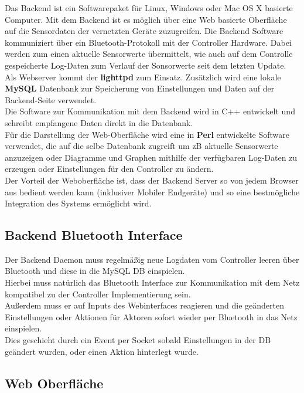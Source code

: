 \documentclass[12pt,a4paper]{article}
\begin{document}
Das Backend ist ein Softwarepaket für Linux, Windows oder Mac OS X basierte Computer. Mit dem Backend ist es möglich über eine Web basierte Oberfläche auf die Sensordaten der vernetzten Geräte zuzugreifen. Die Backend Software kommuniziert über ein Bluetooth-Protokoll mit der Controller Hardware. Dabei werden zum einen aktuelle Sensorwerte übermittelt, wie auch auf dem Controlle gespeicherte Log-Daten zum Verlauf der Sonsorwerte seit dem letzten Update.\\
Als Webserver kommt der {\bf lighttpd} zum Einsatz. Zusätzlich wird eine lokale {\bf MySQL} Datenbank zur Speicherung von Einstellungen und Daten auf der Backend-Seite verwendet.\\
Die Software zur Kommunikation mit dem Backend wird in C++ entwickelt und schreibt empfangene Daten direkt in die Datenbank.\\
Für die Darstellung der Web-Oberfläche wird eine in {\bf Perl} entwickelte Software verwendet, die auf die selbe Datenbank zugreift um zB aktuelle Sensorwerte anzuzeigen oder Diagramme und Graphen mithilfe der verfügbaren Log-Daten zu erzeugen oder Einstellungen für den Controller zu ändern.\\
Der Vorteil der Weboberfläche ist, dass der Backend Server so von jedem Browser aus bedient werden kann (inklusiver Mobiler Endgeräte) und so eine bestmögliche Integration des Systems ermöglicht wird.

\subsection{Backend Bluetooth Interface}
\label{subsec:BTBackend}

Der Backend Daemon muss regelmäßig neue Logdaten vom Controller leeren über Bluetooth und diese in die MySQL DB einspielen.\\
Hierbei muss natürlich das Bluetooth Interface zur Kommunikation mit dem Netz kompatibel zu der Controller Implementierung sein.\\
Außerdem muss er auf Inputs des Webinterfaces reagieren und die geänderten Einstellungen oder Aktionen für Aktoren sofort wieder per Bluetooth in das Netz einspielen.\\
Dies geschieht durch ein Event per Socket sobald Einstellungen in der DB geändert wurden, oder einen Aktion hinterlegt wurde.\\

\subsection{Web Oberfläche}
\end{document}
